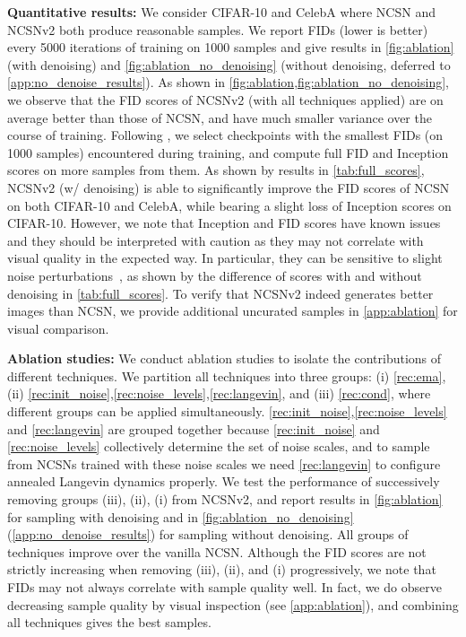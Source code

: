 \documentclass{article}
\begin{document}
\textbf{Quantitative results:} We consider CIFAR-10  and CelebA  where NCSN and NCSNv2 both produce reasonable samples. We report FIDs (lower is better) every 5000 iterations of training on 1000 samples and give results in \cref{fig:ablation} (with denoising) and \cref{fig:ablation_no_denoising} (without denoising, deferred to \cref{app:no_denoise_results}). As shown in \cref{fig:ablation,fig:ablation_no_denoising}, we observe that the FID scores of NCSNv2 (with all techniques applied) are on average better than those of NCSN, and have much smaller variance over the course of training. 
Following \cite{song2019generative}, we select checkpoints with the smallest FIDs (on 1000 samples) encountered during training, and compute full FID and Inception scores on more samples from them. As shown by results in \cref{tab:full_scores}, NCSNv2 (w/ denoising) is able to significantly improve the FID scores of NCSN on both CIFAR-10 and CelebA, while bearing a slight loss of Inception scores on CIFAR-10. However, we note that Inception and FID scores have known issues~\cite{barratt2018note,sajjadi2018assessing} and they should be interpreted with caution as they may not correlate with visual quality in the expected way. In particular, they can be sensitive to slight noise perturbations~\cite{razavi2019generating}, as shown by the difference of scores with and without denoising in \cref{tab:full_scores}. To verify that NCSNv2 indeed generates better images than NCSN, we provide additional uncurated samples in \cref{app:ablation} for visual comparison.



\textbf{Ablation studies:} We conduct ablation studies to isolate the contributions of different techniques. We partition all techniques into three groups: (i) \cref{rec:ema}, (ii) \cref{rec:init_noise},\ref{rec:noise_levels},\ref{rec:langevin}, and (iii) \cref{rec:cond}, where different groups can be applied simultaneously. \cref{rec:init_noise},\ref{rec:noise_levels} and \ref{rec:langevin} are grouped together because \cref{rec:init_noise} and \ref{rec:noise_levels} collectively determine the set of noise scales, and to sample from NCSNs trained with these noise scales we need \cref{rec:langevin} to configure annealed Langevin dynamics properly. We test the performance of successively removing groups (iii), (ii), (i) from NCSNv2, and report results in \cref{fig:ablation} for sampling with denoising and in \cref{fig:ablation_no_denoising} (\cref{app:no_denoise_results}) for sampling without denoising. All groups of techniques improve over the vanilla NCSN. Although the FID scores are not strictly increasing when removing (iii), (ii), and (i) progressively, we note that FIDs may not always correlate with sample quality well. In fact, we do observe decreasing sample quality by visual inspection (see \cref{app:ablation}), and combining all techniques gives the best samples.
\end{document}
